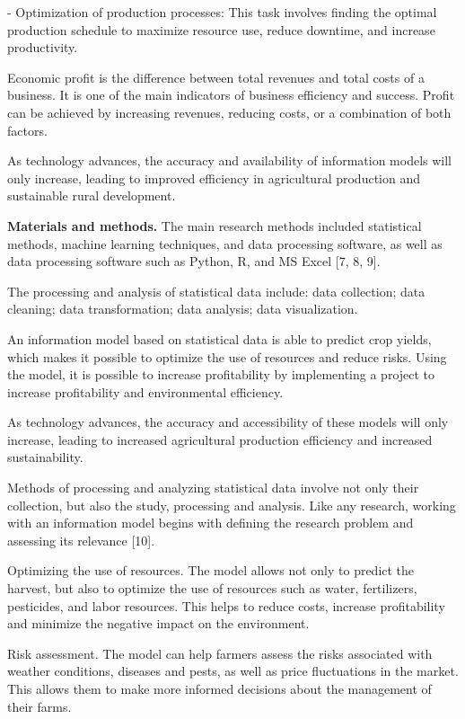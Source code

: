 - Optimization of production processes: This task involves finding the
optimal production schedule to maximize resource use, reduce downtime,
and increase productivity.

Economic profit is the difference between total revenues and total costs
of a business. It is one of the main indicators of business efficiency
and success. Profit can be achieved by increasing revenues, reducing
costs, or a combination of both factors.

As technology advances, the accuracy and availability of information
models will only increase, leading to improved efficiency in
agricultural production and sustainable rural development.

\textbf{Materials and methods.} The main research methods included
statistical methods, machine learning techniques, and data processing
software, as well as data processing software such as Python, R, and MS
Excel {[}7, 8, 9{]}.

The processing and analysis of statistical data include: data
collection; data cleaning; data transformation; data analysis; data
visualization.

An information model based on statistical data is able to predict crop
yields, which makes it possible to optimize the use of resources and
reduce risks. Using the model, it is possible to increase profitability
by implementing a project to increase profitability and environmental
efficiency.

As technology advances, the accuracy and accessibility of these models
will only increase, leading to increased agricultural production
efficiency and increased sustainability.

Methods of processing and analyzing statistical data involve not only
their collection, but also the study, processing and analysis. Like any
research, working with an information model begins with defining the
research problem and assessing its relevance {[}10{]}.

Optimizing the use of resources. The model allows not only to predict
the harvest, but also to optimize the use of resources such as water,
fertilizers, pesticides, and labor resources. This helps to reduce
costs, increase profitability and minimize the negative impact on the
environment.

Risk assessment. The model can help farmers assess the risks associated
with weather conditions, diseases and pests, as well as price
fluctuations in the market. This allows them to make more informed
decisions about the management of their farms.

